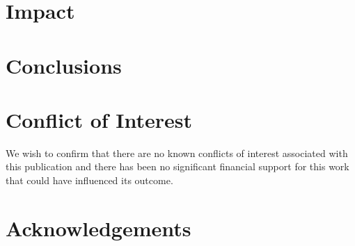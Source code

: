\documentclass[preprint, review, 12pt, a4paper]{elsarticle}
\begin{document}
\section{Impact}\label{impact}



\section{Conclusions}\label{conclusion}



\section{Conflict of Interest}
We wish to confirm that there are no known conflicts of interest associated with this publication and there has been no significant financial support for this work that could have influenced its outcome.


\section*{Acknowledgements}\label{ack}







\end{document}
